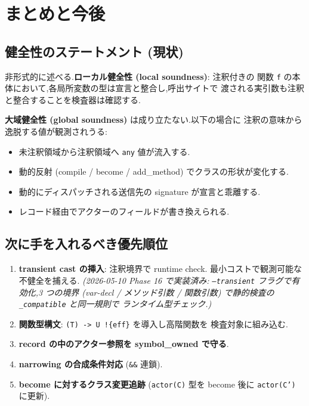 \documentclass[11pt,a4paper]{article}
\newcommand{\code}[1]{\texttt{\small #1}}
\begin{document}
\section{まとめと今後}

\subsection{健全性のステートメント (現状)}

非形式的に述べる.\textbf{ローカル健全性 (local soundness)}: 注釈付きの
関数 \code{f} の本体において,各局所変数の型は宣言と整合し,呼出サイトで
渡される実引数も注釈と整合することを検査器は確認する.

\textbf{大域健全性 (global soundness)} は成り立たない.以下の場合に
注釈の意味から逸脱する値が観測されうる:

\begin{itemize}[leftmargin=1.5em]
\item 未注釈領域から注釈領域へ \code{any} 値が流入する.
\item 動的反射 (compile / become / add\_method) でクラスの形状が変化する.
\item 動的にディスパッチされる送信先の signature が宣言と乖離する.
\item レコード経由でアクターのフィールドが書き換えられる.
\end{itemize}

\subsection{次に手を入れるべき優先順位}

\begin{enumerate}[leftmargin=1.5em]
\item \textbf{transient cast の挿入}: 注釈境界で runtime check.
      最小コストで観測可能な不健全を捕える.
      \textit{(2026-05-10 Phase 16 で実装済み: \code{--transient}
      フラグで有効化,3 つの境界 (var-decl / メソッド引数 /
      関数引数) で静的検査の \code{\_compatible} と同一規則で
      ランタイム型チェック.)}
\item \textbf{関数型構文}: \code{(T) -> U !\{eff\}} を導入し高階関数を
      検査対象に組み込む.
\item \textbf{record の中のアクター参照を symbol\_owned で守る}.
\item \textbf{narrowing の合成条件対応} (\code{\&\&} 連鎖).
\item \textbf{become に対するクラス変更追跡} (\code{actor(C)} 型を
      become 後に \code{actor(C')} に更新).
\end{enumerate}
\end{document}
